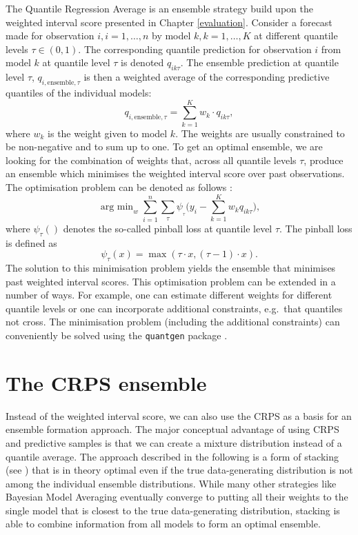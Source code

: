 \documentclass[
]{book}
\begin{document}
The Quantile Regression Average \citep{nowotarskiComputingElectricitySpot2015} is an ensemble strategy build upon the weighted interval score presented in Chapter \ref{evaluation}.
Consider a forecast made for observation \(i, i = 1, \dots, n\) by model \(k, k = 1, \dots, K\) at different quantile levels \(\tau \in (0,1)\). The corresponding quantile prediction for observation \(i\) from model \(k\) at quantile level \(\tau\) is denoted \(q_{ik\tau}\). The ensemble prediction at quantile level \(\tau\), \(q_{i, \text{ensemble},\tau}\) is then a weighted average of the corresponding predictive quantiles of the individual models:
\[q_{i,\text{ensemble}, \tau} = \sum_{k = 1}^K w_k \cdot q_{ik\tau},\]
where \(w_k\) is the weight given to model \(k\). The weights are usually constrained to be non-negative and to sum up to one. To get an optimal ensemble, we are looking for the combination of weights that, across all quantile levels \(\tau\), produce an ensemble which minimises the weighted interval score over past observations. The optimisation problem can be denoted as follows \citep{ryantibshiraniQuantileStacking2020}:
\[\mathop{\text{arg min}}_{w} \sum_{i=1}^n \sum_{\tau} \psi_{_\tau} \bigg(y_i - \sum_{k=1}^K w_k q_{ik\tau} \bigg),\]
where \(\psi_{\tau}()\) denotes the so-called pinball loss at quantile level \(\tau\). The pinball loss is defined as
\[\psi_{\tau}(x) = \max(\tau \cdot x, (\tau-1)\cdot x).\]
The solution to this minimisation problem yields the ensemble that minimises past weighted interval scores. This optimisation problem can be extended in a number of ways. For example, one can estimate different weights for different quantile levels or one can incorporate additional constraints, e.g.~that quantiles not cross. The minimisation problem (including the additional constraints) can conveniently be solved using the \texttt{quantgen} package \citep{R-quantgen}.

\hypertarget{the-crps-ensemble}{%
\section{The CRPS ensemble}\label{the-crps-ensemble}}

Instead of the weighted interval score, we can also use the CRPS as a basis for an ensemble formation approach. The major conceptual advantage of using CRPS and predictive samples is that we can create a mixture distribution instead of a quantile average. The approach described in the following is a form of stacking (see \citet{yaoUsingStackingAverage2018}) that is in theory optimal even if the true data-generating distribution is not among the individual ensemble distributions. While many other strategies like Bayesian Model Averaging eventually \citep{rafteryBayesianModelAveraging1997, hoetingBayesianModelAveraging1999, rafteryUsingBayesianModel2005} converge to putting all their weights to the single model that is closest to the true data-generating distribution, stacking is able to combine information from all models to form an optimal ensemble.
\end{document}
